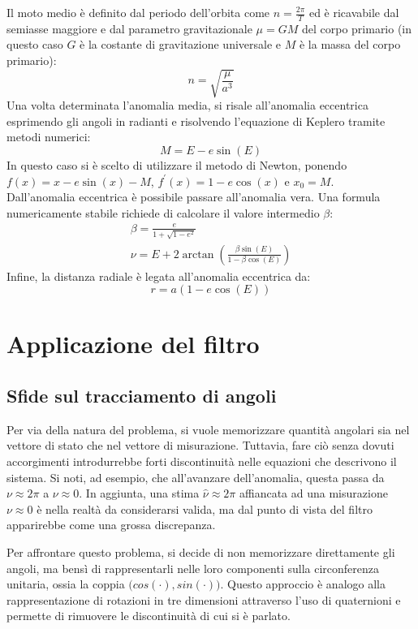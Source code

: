\documentclass[12pt,a4paper,openright,twoside]{book}
\begin{document}
Il moto medio è definito dal periodo dell'orbita come $n=\frac{2\pi}{T}$ ed è ricavabile dal semiasse maggiore e dal parametro gravitazionale $\mu=GM$ del corpo primario (in questo caso $G$ è la costante di gravitazione universale e $M$ è la massa del corpo primario):
\begin{equation}
n=\sqrt{\frac{\mu}{a^3}}
\end{equation}
Una volta determinata l'anomalia media, si risale all'anomalia eccentrica esprimendo gli angoli in radianti e risolvendo l'equazione di Keplero tramite metodi numerici:
\begin{equation}
M=E-e\sin(E)
\end{equation}
In questo caso si è scelto di utilizzare il metodo di Newton, ponendo $f(x)=x-e\sin(x)-M$, $f^\prime(x)=1-e\cos(x)$ e $x_0=M$. \\
Dall'anomalia eccentrica è possibile passare all'anomalia vera. Una formula numericamente stabile richiede di calcolare il valore intermedio $\beta$:
\begin{gather}
\beta=\frac{e}{1+\sqrt{1-e^2}} \\
\nu=E+2\arctan\left(\frac{\beta\sin(E)}{1-\beta\cos(E)}\right)
\end{gather}
Infine, la distanza radiale è legata all'anomalia eccentrica da:
\begin{equation}
r=a(1-e\cos(E))
\end{equation}

\chapter{Applicazione del filtro}

\section{Sfide sul tracciamento di angoli}

Per via della natura del problema, si vuole memorizzare quantità angolari sia nel vettore di stato che nel vettore di misurazione. Tuttavia, fare ciò senza dovuti accorgimenti introdurrebbe forti discontinuità nelle equazioni che descrivono il sistema. Si noti, ad esempio, che all'avanzare dell'anomalia, questa passa da $\nu\approx2\pi$ a $\nu\approx0$. In aggiunta, una stima $\hat{\nu}\approx2\pi$ affiancata ad una misurazione $\nu\approx0$ è nella realtà da considerarsi valida, ma dal punto di vista del filtro apparirebbe come una grossa discrepanza.

Per affrontare questo problema, si decide di non memorizzare direttamente gli angoli, ma bensì di rappresentarli nelle loro componenti sulla circonferenza unitaria, ossia la coppia $\bigl(cos(\cdot),sin(\cdot)\bigr)$. Questo approccio è analogo alla rappresentazione di rotazioni in tre dimensioni attraverso l'uso di quaternioni e permette di rimuovere le discontinuità di cui si è parlato.
\end{document}

